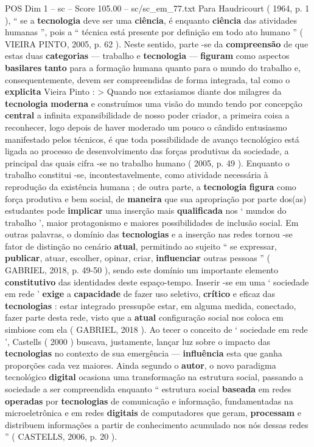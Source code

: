 \begin{textsample}{POS Dim 1 – sc – Score 105.00 – sc/sc\_em\_77.txt}
Para Haudricourt ( 1964, p. 1 ), “ se a \textbf{tecnologia} deve ser uma \textbf{ciência}, é enquanto \textbf{ciência} das atividades humanas ”, pois a “ técnica está presente por definição em todo ato humano ” ( VIEIRA PINTO, 2005, p. 62 ).
Neste sentido, parte -se da \textbf{compreensão} de que estas duas \textbf{categorias} — trabalho e \textbf{tecnologia} — \textbf{figuram} como aspectos \textbf{basilares} \textbf{tanto} para a formação humana quanto para o mundo do trabalho e, consequentemente, devem ser compreendidas de forma integrada, tal como o \textbf{explicita} Vieira Pinto : > Quando nos extasiamos diante dos milagres da \textbf{tecnologia} \textbf{moderna} e construímos uma visão do mundo tendo por concepção \textbf{central} a infinita expansibilidade de nosso poder criador, a primeira coisa a reconhecer, logo depois de haver moderado um pouco o cândido entusiasmo manifestado pelos técnicos, é que toda possibilidade de avanço tecnológico está ligada ao processo de desenvolvimento das forças produtivas da sociedade, a principal das quais cifra -se no trabalho humano ( 2005, p. 49 ).
Enquanto o trabalho constitui -se, incontestavelmente, como atividade necessária à reprodução da existência humana ; de outra parte, a \textbf{tecnologia} \textbf{figura} como força produtiva e bem social, de \textbf{maneira} que sua apropriação por parte dos(as) estudantes pode \textbf{implicar} uma inserção mais \textbf{qualificada} nos ‘ mundos do trabalho ’, maior protagonismo e maiores possibilidades de inclusão social.
Em outras palavras, o domínio das \textbf{tecnologias} e a inserção nas redes tornou -se fator de distinção no cenário \textbf{atual}, permitindo ao sujeito “ se expressar, \textbf{publicar}, atuar, escolher, opinar, criar, \textbf{influenciar} outras pessoas ” ( GABRIEL, 2018, p. 49-50 ), sendo este domínio um importante elemento \textbf{constitutivo} das identidades deste espaço-tempo.
Inserir -se em uma ‘ sociedade em rede ’ \textbf{exige} a \textbf{capacidade} de fazer uso seletivo, \textbf{crítico} e eficaz das \textbf{tecnologias} : estar integrado pressupõe estar, em alguma medida, conectado, fazer parte desta rede, visto que a \textbf{atual} configuração social nos coloca em simbiose com ela ( GABRIEL, 2018 ).
Ao tecer o conceito de ‘ sociedade em rede ’, Castells ( 2000 ) buscava, justamente, lançar luz sobre o impacto das \textbf{tecnologias} no contexto de sua emergência — \textbf{influência} esta que ganha proporções cada vez maiores.
Ainda segundo o \textbf{autor}, o novo paradigma tecnológico \textbf{digital} ocasiona uma transformação na estrutura social, passando a sociedade a ser compreendida enquanto “ estrutura social \textbf{baseada} em redes \textbf{operadas} por \textbf{tecnologias} de comunicação e informação, fundamentadas na microeletrônica e em redes \textbf{digitais} de computadores que geram, \textbf{processam} e distribuem informações a partir de conhecimento acumulado nos nós dessas redes ” ( CASTELLS, 2006, p. 20 ).

\end{textsample}
